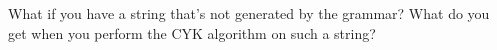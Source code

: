 What if you have a string that's not generated by the grammar?
What do you get when you perform the CYK algorithm on such a string?
